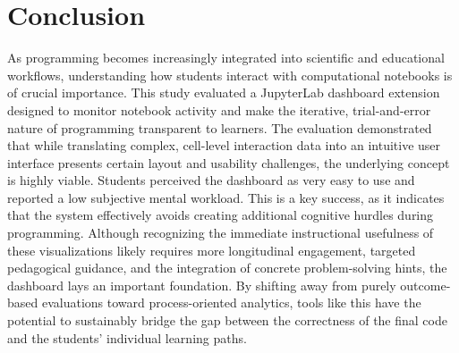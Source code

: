 \section{Conclusion}
As programming becomes increasingly integrated into scientific and educational workflows, understanding how students interact with computational notebooks is of crucial importance. This study evaluated a JupyterLab dashboard extension designed to monitor notebook activity and make the iterative, trial-and-error nature of programming transparent to learners. The evaluation demonstrated that while translating complex, cell-level interaction data into an intuitive user interface presents certain layout and usability challenges, the underlying concept is highly viable. Students perceived the dashboard as very easy to use and reported a low subjective mental workload. This is a key success, as it indicates that the system effectively avoids creating additional cognitive hurdles during programming. Although recognizing the immediate instructional usefulness of these visualizations likely requires more longitudinal engagement, targeted pedagogical guidance, and the integration of concrete problem-solving hints, the dashboard lays an important foundation. By shifting away from purely outcome-based evaluations toward process-oriented analytics, tools like this have the potential to sustainably bridge the gap between the correctness of the final code and the students' individual learning paths.